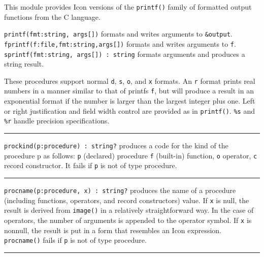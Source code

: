 This module provides Icon versions of the
\texttt{printf()} family of formatted output functions
from the C language.

\texttt{printf(fmt:string, args[])} formats and writes arguments to
\texttt{\&output}.\\
\texttt{fprintf(f:file,fmt:string,args[])} formats and writes arguments
to \texttt{f}.\\
\texttt{sprintf(fmt:string, args[]) : string} formats arguments and
produces a string result.

These procedures support normal \texttt{d}, \texttt{s}, \texttt{o}, and
\texttt{x} formats. An \texttt{{\textquotedbl}r{\textquotedbl}} format
prints real numbers in a manner similar to that of
printf{\textquotesingle}s \texttt{{\textquotedbl}f{\textquotedbl}}, but
will produce a result in an exponential format if the number is larger
than the largest integer plus one. Left or right justification and
field width control are provided as in \texttt{printf()}. \texttt{\%s}
and \texttt{\%r} handle precision specifications.

\vspace{0.25cm}\hrule{}

\texttt{prockind(p:procedure) : string?} produces a code for the kind of
the procedure p as follows: \texttt{{\textquotedbl}p{\textquotedbl}}
(declared) procedure \texttt{{\textquotedbl}f{\textquotedbl}}
(built-in) function, \texttt{{\textquotedbl}o{\textquotedbl}} operator,
\texttt{{\textquotedbl}c{\textquotedbl}} record
constructor. It fails if \texttt{p} is not of type
procedure. 

\vspace{0.25cm}\hrule{}

\texttt{procname(p:procedure, x) : string?} produces the name of a
procedure (including functions, operators, and record
constructors) value. If \texttt{x} is null,
the result is derived from \texttt{image()} in a relatively
straightforward way. In the case of operators, the number of arguments
is appended to the operator symbol. If \texttt{x} is nonnull, the
result is put in a form that resembles an Icon expression.
\texttt{procname()} fails if \texttt{p} is not of type procedure. 

\vspace{0.25cm}\hrule{}

